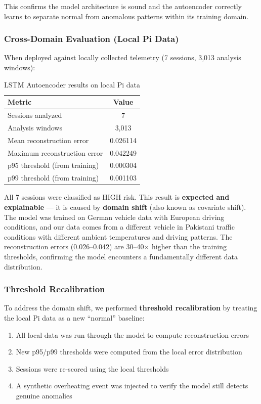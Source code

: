This confirms the model architecture is sound and the autoencoder correctly learns to separate normal from anomalous patterns within its training domain.

\subsubsection{Cross-Domain Evaluation (Local Pi Data)}

When deployed against locally collected telemetry (7 sessions, 3,013 analysis windows):

\begin{table}[h]
\centering
\begin{tabular}{|l|c|}
\hline
\textbf{Metric} & \textbf{Value} \\
\hline
Sessions analyzed & 7 \\
\hline
Analysis windows & 3,013 \\
\hline
Mean reconstruction error & 0.026114 \\
\hline
Maximum reconstruction error & 0.042249 \\
\hline
p95 threshold (from training) & 0.000304 \\
\hline
p99 threshold (from training) & 0.001103 \\
\hline
\end{tabular}
\caption{LSTM Autoencoder results on local Pi data}
\label{tab:lstm_deployment}
\end{table}

All 7 sessions were classified as HIGH risk. This result is \textbf{expected and explainable} --- it is caused by \textbf{domain shift} (also known as covariate shift). The model was trained on German vehicle data with European driving conditions, and our data comes from a different vehicle in Pakistani traffic conditions with different ambient temperatures and driving patterns. The reconstruction errors (0.026--0.042) are 30--40$\times$ higher than the training thresholds, confirming the model encounters a fundamentally different data distribution.

\subsubsection{Threshold Recalibration}

To address the domain shift, we performed \textbf{threshold recalibration} by treating the local Pi data as a new ``normal'' baseline:

\begin{enumerate}
    \item All local data was run through the model to compute reconstruction errors
    \item New p95/p99 thresholds were computed from the local error distribution
    \item Sessions were re-scored using the local thresholds
    \item A synthetic overheating event was injected to verify the model still detects genuine anomalies
\end{enumerate}

